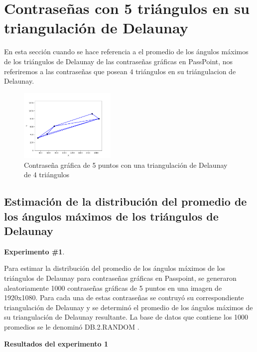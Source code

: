 \documentclass[12pt]{report}
\begin{document}
\section{Contraseñas con 5 triángulos en su triangulación de Delaunay }
En esta sección cuando se hace referencia  a el promedio de los ángulos máximos de los triángulos de Delaunay  de las contraseñas gráficas en PassPoint, nos referiremos a las contraseñas que posean 4 triángulos en su triángulacion de Delaunay. 

\begin{figure}[ht]
	\centering
	
	\includegraphics[width=0.41\textwidth]{alea4td.png}
	\caption{Contraseña gráfica de 5 puntos con una triangulación de Delaunay de 4 triángulos}
	\label{5TD}
\end{figure}

\subsection{Estimación de la distribución del promedio de los ángulos máximos de los triángulos de Delaunay }
\textbf{Experimento \#1}.

Para estimar la distribución del promedio de los ángulos máximos de los triángulos de Delaunay para contraseñas gráficas en Passpoint, se generaron aleatoriamente 1000 contraseñas gráficas de 5 puntos en una imagen de 1920x1080. Para cada una de estas contraseñas se  contruyó  su correspondiente triangulación  de Delaunay  y se  determinó el promedio  de los ángulos máximos de su triangulación de Delaunay resultante. La base de datos que contiene los 1000 promedios se le denominó DB.2.RANDOM .


\textbf{Resultados del experimento 1}
\end{document}
